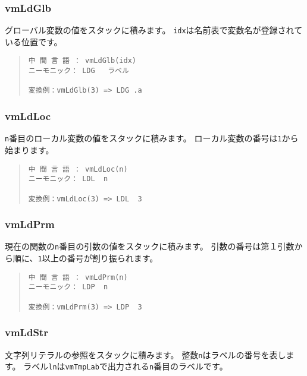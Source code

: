 \subsubsection{vmLdGlb}

グローバル変数の値をスタックに積みます。
\verb/idx/は名前表で変数名が登録されている位置です。

\begin{quote}
\begin{verbatim}
中 間 言 語 ： vmLdGlb(idx)
ニーモニック： LDG   ラベル

変換例：vmLdGlb(3) => LDG .a
\end{verbatim}
\end{quote}

\subsubsection{vmLdLoc}

\verb/n/番目のローカル変数の値をスタックに積みます。
ローカル変数の番号は\verb/1/から始まります。

\begin{quote}
\begin{verbatim}
中 間 言 語 ： vmLdLoc(n)
ニーモニック： LDL  n   

変換例：vmLdLoc(3) => LDL  3
\end{verbatim}
\end{quote}

\subsubsection{vmLdPrm}

現在の関数の\verb/n/番目の引数の値をスタックに積みます。
引数の番号は第１引数から順に、\verb/1/以上の番号が割り振られます。

\begin{quote}
\begin{verbatim}
中 間 言 語 ： vmLdPrm(n)
ニーモニック： LDP  n   

変換例：vmLdPrm(3) => LDP  3
\end{verbatim}
\end{quote}

\subsubsection{vmLdStr}

文字列リテラルの参照をスタックに積みます。
整数\verb/n/はラベルの番号を表します。
ラベル\verb/ln/は\verb/vmTmpLab/で出力される\verb/n/番目のラベルです。

